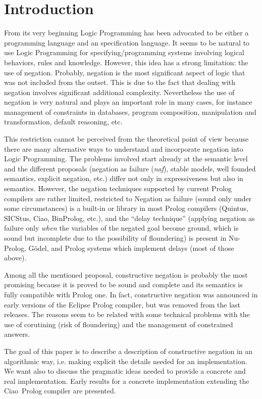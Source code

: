 \documentclass{llncs}
\newcommand{\naf}{{\em naf}}\newcommand{\viejo}[1]{}
\newcommand{\ciao}{Ciao}
\begin{document}
\section{Introduction}
\label{introduction}
From its very beginning Logic Programming has been advocated to be either
a programming language and an specification language. 
It seems to be natural to use Logic Programming for specifying/programming systems
involving logical behaviors, rules and knowledge. However, this idea has a strong
limitation: the use of negation.
Probably,
negation is the most significant aspect of logic that was not included
from the outset. This is due to the fact that dealing with negation
involves significant additional complexity. 
Nevertheless the use of negation is very natural and plays an important role 
in many cases, for instance management of constraints in databases, program
composition, manipulation and transformation, default reasoning,
etc.

This restriction cannot be perceived from the theoretical point of view because
there are many alternative ways to understand and
incorporate negation into Logic Programming. The problems involved
start already at the semantic level and the different proposals
(negation as failure (\naf), stable models, well founded semantics, explicit
negation, etc.)  differ not only in expressiveness but also in
semantics.  
However, the negation techniques supported by current
Prolog compilers are rather limited, restricted to Negation as failure 
(sound only under some circumstances) is a
built-in or library in most Prolog compilers (Quintus, SICStus, Ciao,
BinProlog, etc.), and the ``delay technique'' (applying negation as failure only
\emph{when} the variables of the negated goal become ground, which is
sound but incomplete due to the possibility of floundering) is present
in Nu-Prolog, G\"odel, and Prolog systems which implement delays (most
of those above).

Among all the mentioned proposal, constructive negation is probably the most 
promising because it is proved to be sound and complete and
its semantics is fully compatible with Prolog one. In fact, 
constructive negation was announced in early versions of the 
Eclipse Prolog compiler, but was removed from the last releases.
The reasons seem to be related with some technical problems with the use
of corutining (risk of floundering) and the management of constrained answers.


The goal of this paper is to describe a description of constructive negation
in an algorithmic way, i.e. making explicit the details needed for an 
implementation. We want also to discuss the pragmatic ideas needed to
provide a concrete and real implementation. Early results for a concrete 
implementation extending the \ciao\ Prolog compiler are presented.
\end{document}
